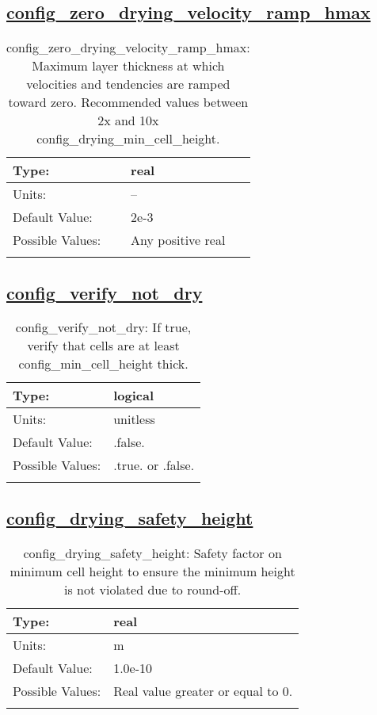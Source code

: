 \subsection[config\_zero\_drying\_velocity\_ramp\_hmax]{\hyperref[sec:nm_tab_wetting_drying]{config\_zero\_drying\_velocity\_ramp\_hmax}}
\label{subsec:nm_sec_config_zero_drying_velocity_ramp_hmax}
\begin{center}
\begin{longtable}{| p{2.0in} || p{4.0in} |}
    \hline
    Type: & real \\
    \hline
    Units: & -- \\
    \hline
    Default Value: & 2e-3 \\
    \hline
    Possible Values: & Any positive real \\
    \hline
    \caption{config\_zero\_drying\_velocity\_ramp\_hmax: Maximum layer thickness at which velocities and tendencies are ramped toward zero. Recommended values between 2x and 10x config\_drying\_min\_cell\_height.}
\end{longtable}
\end{center}
\subsection[config\_verify\_not\_dry]{\hyperref[sec:nm_tab_wetting_drying]{config\_verify\_not\_dry}}
\label{subsec:nm_sec_config_verify_not_dry}
\begin{center}
\begin{longtable}{| p{2.0in} || p{4.0in} |}
    \hline
    Type: & logical \\
    \hline
    Units: & \si{unitless} \\
    \hline
    Default Value: & .false. \\
    \hline
    Possible Values: & .true. or .false. \\
    \hline
    \caption{config\_verify\_not\_dry: If true, verify that cells are at least config\_min\_cell\_height thick.}
\end{longtable}
\end{center}
\subsection[config\_drying\_safety\_height]{\hyperref[sec:nm_tab_wetting_drying]{config\_drying\_safety\_height}}
\label{subsec:nm_sec_config_drying_safety_height}
\begin{center}
\begin{longtable}{| p{2.0in} || p{4.0in} |}
    \hline
    Type: & real \\
    \hline
    Units: & \si{m} \\
    \hline
    Default Value: & 1.0e-10 \\
    \hline
    Possible Values: & Real value greater or equal to 0. \\
    \hline
    \caption{config\_drying\_safety\_height: Safety factor on minimum cell height to ensure the minimum height is not violated due to round-off.}
\end{longtable}
\end{center}

